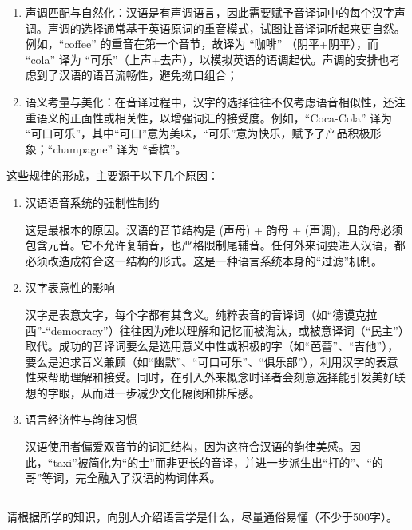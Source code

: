 \documentclass[10pt]{ctexart}
\begin{document}
\begin{enumerate}
    \item 声调匹配与自然化：汉语是有声调语言，因此需要赋予音译词中的每个汉字声调。声调的选择通常基于英语原词的重音模式，试图让音译词听起来更自然。例如，``coffee'' 的重音在第一个音节，故译为 ``咖啡'' （阴平+阴平），而 ``cola'' 译为 ``可乐''（上声+去声），以模拟英语的语调起伏。声调的安排也考虑到了汉语的语音流畅性，避免拗口组合；
    
    \item 语义考量与美化：在音译过程中，汉字的选择往往不仅考虑语音相似性，还注重语义的正面性或相关性，以增强词汇的接受度。例如，``Coca-Cola'' 译为 ``可口可乐''，其中``可口''意为美味，``可乐''意为快乐，赋予了产品积极形象；``champagne'' 译为 ``香槟''。
\end{enumerate}

这些规律的形成，主要源于以下几个原因：
\begin{enumerate}
    \item 汉语语音系统的强制性制约
    
    这是最根本的原因。汉语的音节结构是 (声母) + 韵母 + (声调)，且韵母必须包含元音。它不允许复辅音，也严格限制尾辅音。任何外来词要进入汉语，都必须改造成符合这一结构的形式。这是一种语言系统本身的``过滤''机制。

    \item 汉字表意性的影响
    
    汉字是表意文字，每个字都有其含义。纯粹表音的音译词（如``德谟克拉西''-``democracy''）往往因为难以理解和记忆而被淘汰，或被意译词（``民主''）取代。成功的音译词要么是选用意义中性或积极的字（如``芭蕾''、``吉他''），要么是追求音义兼顾（如``幽默''、``可口可乐''、``俱乐部''），利用汉字的表意性来帮助理解和接受。同时，在引入外来概念时译者会刻意选择能引发美好联想的字眼，从而进一步减少文化隔阂和排斥感。

    \item 语言经济性与韵律习惯
    
    汉语使用者偏爱双音节的词汇结构，因为这符合汉语的韵律美感。因此，``taxi''被简化为``的士''而非更长的音译，并进一步派生出``打的''、``的哥''等词，完全融入了汉语的构词体系。
\end{enumerate}

\subsection{}
{\heiti
请根据所学的知识，向别人介绍语言学是什么，尽量通俗易懂（不少于500字）。
}

\vspace{0.5cm}  
\end{document}
